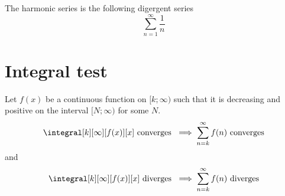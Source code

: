 \documentclass[a4paper]{article}
\begin{document}
The harmonic series is the following digergent series
\[
    \sum_{n=1}^\infty \frac{1}{n}
\]

\section{Integral test}

Let \(f(x)\) be a continuous function on \([k;\infty)\)
such that it is decreasing and positive on the interval \([N; \infty)\)
for some \(N\).
\[
    \integral[k][\infty][f(x)][x] \text{ converges } \implies
    \sum_{n=k}^{\infty} f(n) \text{ converges}
\]
and
\[
    \integral[k][\infty][f(x)][x] \text{ diverges } \implies
    \sum_{n=k}^{\infty} f(n) \text{ diverges}
\]
\end{document}
